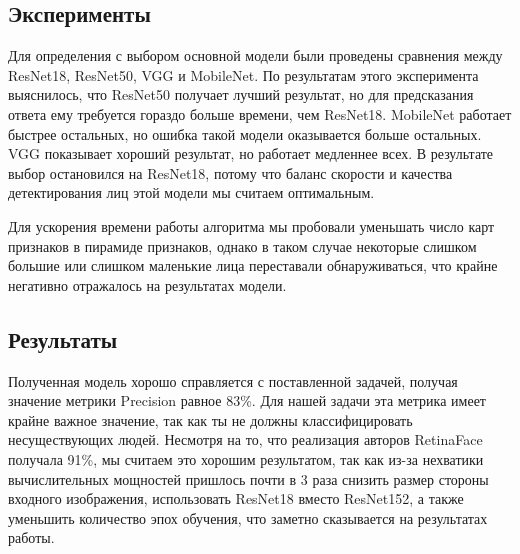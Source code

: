 \subsection{Эксперименты}\label{subsec:эксперименты2}
Для определения с выбором основной модели были проведены сравнения между ResNet18, ResNet50, VGG и MobileNet.
По результатам этого эксперимента выяснилось, что ResNet50 получает лучший результат,
но для предсказания ответа ему требуется гораздо больше времени, чем ResNet18.
MobileNet работает быстрее остальных, но ошибка такой модели оказывается больше остальных.
VGG показывает хороший результат, но работает медленнее всех.
В результате выбор остановился на ResNet18, потому что баланс скорости и качества детектирования лиц этой модели мы считаем оптимальным.

Для ускорения времени работы алгоритма мы пробовали уменьшать число карт признаков в пирамиде признаков,
однако в таком случае некоторые слишком большие или слишком маленькие лица переставали обнаруживаться,
что крайне негативно отражалось на результатах модели.

\subsection{Результаты}\label{subsec:результаты2}
Полученная модель хорошо справляется с поставленной задачей, получая значение метрики Precision равное 83\%.
Для нашей задачи эта метрика имеет крайне важное значение, так как ты не должны классифицировать несуществующих людей.
Несмотря на то, что реализация авторов RetinaFace получала 91\%, мы считаем это хорошим результатом,
так как из-за нехватики вычислительных мощностей пришлось почти в 3 раза снизить размер стороны входного изображения,
использовать ResNet18 вместо ResNet152, а также уменьшить количество эпох обучения, что заметно сказывается на результатах работы.

\newpage


